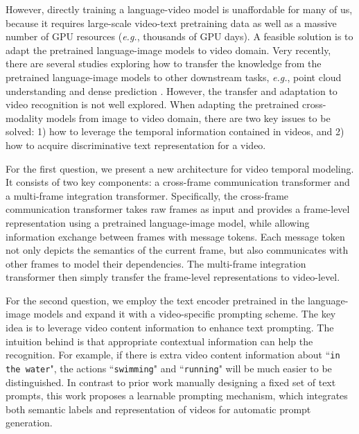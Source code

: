 \documentclass[runningheads]{llncs}
\begin{document}
However, directly training a language-video model is unaffordable for many of us, because it requires large-scale video-text pretraining data as well as a massive number of GPU resources (\emph{e.g.}, thousands of GPU days). A feasible solution is to adapt the pretrained language-image models to video domain. Very recently, there are several studies exploring how to transfer the knowledge from the pretrained language-image models to other downstream tasks, \emph{e.g.}, point cloud understanding \cite{zhang2021pointclip} and dense prediction \cite{rao2021denseclip,zhou2021denseclip}. However, the transfer and adaptation to video recognition is not well explored. When adapting the pretrained cross-modality models from image to video domain, there are two key issues to be solved: 1) how to leverage the temporal information contained in videos, and 2) how to acquire discriminative text representation for a video.

For the first question, we present a new architecture for video temporal modeling. It consists of two key components: a cross-frame communication transformer and a multi-frame integration transformer. Specifically, the cross-frame communication transformer takes raw frames as input and provides a frame-level representation using a pretrained language-image model, while allowing information exchange between frames with message tokens. Each message token not only depicts the semantics of the current frame, but also communicates with other frames to model their dependencies. The multi-frame integration transformer then simply transfer the frame-level representations to video-level.

For the second question, we employ the text encoder pretrained in the language-image models and expand it with a video-specific prompting scheme. The key idea is to leverage video content information to enhance text prompting. The intuition behind is that appropriate contextual information can help the recognition. For example, if there is extra video content information about ``\texttt{in the water}", the actions ``\texttt{swimming}" and ``\texttt{running}" will be much easier to be distinguished. 
In contrast to prior work manually designing a fixed set of text prompts, this work proposes a learnable prompting mechanism, which integrates both semantic labels and representation of videos for automatic prompt generation.
\end{document}
